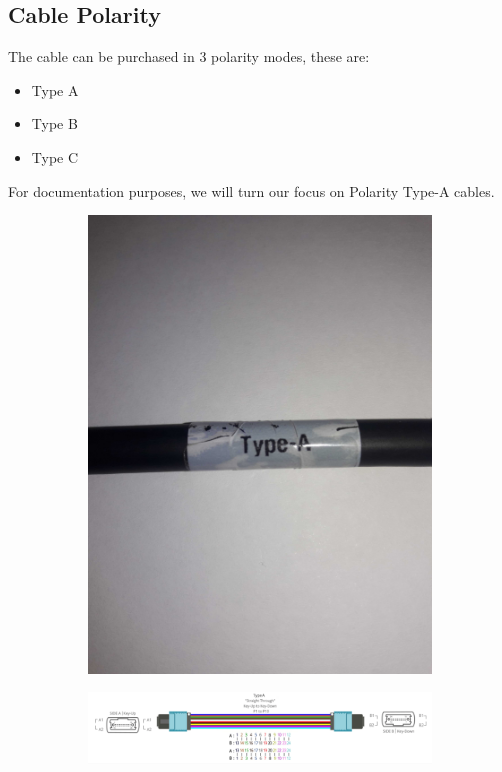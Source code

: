   \subsection{Cable Polarity}
  The cable can be purchased in 3 polarity modes, these are:
  \begin{itemize}
    \item Type A
    \item Type B
    \item Type C
  \end{itemize}
  For documentation purposes, we will turn our focus on Polarity Type-A cables.
  \begin{figure}
    \centering
    \begin{subfigure}{0.48\textwidth}
      \centering
      \includegraphics[width=\textwidth]{images/66.jpg}
    \end{subfigure}
    \hfill
    \begin{subfigure}{0.48\textwidth}
      \centering
      \includegraphics[width=\textwidth]{images/7.png}
    \end{subfigure}
  \end{figure}

